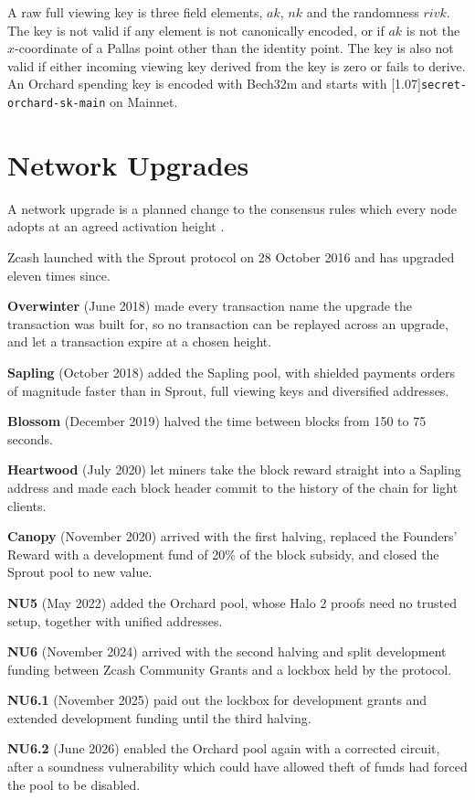 \documentclass{article}
\let\oldtexttt\texttt
\renewcommand{\texttt}[1]{\scalebox{0.97}[1.07]{\oldtexttt{#1}}}
\let\oldcite\cite
\renewcommand{\cite}[2][]{\raisebox{0ex}{\oldcite[{#1}]{#2}}}
\newcommand{\lsection}[2]{\def\sectionlabel{#2} \section{#1}\label{#2}}
\newcommand{\intropart}{\needspace{55ex}}
\theoremstyle{labelledtheorem} %
\begin{document}
A raw full viewing key is three field elements, $\mathit{ak}$, $\mathit{nk}$ and the randomness $\mathit{rivk}$. The key is not valid if any element is not canonically encoded, or if $\mathit{ak}$ is not the $x$-coordinate of a Pallas point other than the identity point. The key is also not valid if either incoming viewing key derived from the key is zero or fails to derive. An Orchard spending key is encoded with Bech32m and starts with \texttt{secret-orchard-sk-main} on Mainnet.


\intropart
\lsection{Network Upgrades}{networkupgrades}

A network upgrade is a planned change to the consensus rules which every node adopts at an agreed activation height \cite{ZIP-200}.

Zcash launched with the Sprout protocol on 28 October 2016 and has upgraded eleven times since.

\textbf{Overwinter} (June 2018) made every transaction name the upgrade the transaction was built for, so no transaction can be replayed across an upgrade, and let a transaction expire at a chosen height.

\textbf{Sapling} (October 2018) added the Sapling pool, with shielded payments orders of magnitude faster than in Sprout, full viewing keys and diversified addresses.

\textbf{Blossom} (December 2019) halved the time between blocks from 150 to 75 seconds.

\textbf{Heartwood} (July 2020) let miners take the block reward straight into a Sapling address and made each block header commit to the history of the chain for light clients.

\textbf{Canopy} (November 2020) arrived with the first halving, replaced the Founders' Reward with a development fund of 20\% of the block subsidy, and closed the Sprout pool to new value.

\textbf{NU5} (May 2022) added the Orchard pool, whose Halo 2 proofs need no trusted setup, together with unified addresses.

\textbf{NU6} (November 2024) arrived with the second halving and split development funding between Zcash Community Grants and a lockbox held by the protocol.

\textbf{NU6.1} (November 2025) paid out the lockbox for development grants and extended development funding until the third halving.

\textbf{NU6.2} (June 2026) enabled the Orchard pool again with a corrected circuit, after a soundness vulnerability which could have allowed theft of funds had forced the pool to be disabled.
\end{document}
